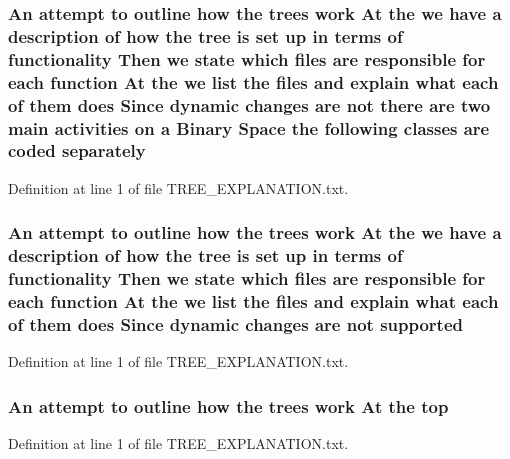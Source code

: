 \subsubsection[{separately}]{\setlength{\rightskip}{0pt plus 5cm}An attempt to outline how the trees work At the we have a description of how the tree is {\bf set} up in terms of functionality Then we state which files are responsible for each function At the we list the files and explain what each of them does Since dynamic changes are not there are two main activities on a Binary Space the following classes are coded separately}\label{TREE__EXPLANATION_8txt_ad716a54edcd729903b6c5fbcf0251ed4}


Definition at line 1 of file T\-R\-E\-E\-\_\-\-E\-X\-P\-L\-A\-N\-A\-T\-I\-O\-N.\-txt.

\subsubsection[{supported}]{\setlength{\rightskip}{0pt plus 5cm}An attempt to outline how the trees work At the we have a description of how the tree is {\bf set} up in terms of functionality Then we state which files are responsible for each function At the we list the files and explain what each of them does Since dynamic changes are not supported}\label{TREE__EXPLANATION_8txt_afb1a32b6e5d94f27b625d0c71f708b7f}


Definition at line 1 of file T\-R\-E\-E\-\_\-\-E\-X\-P\-L\-A\-N\-A\-T\-I\-O\-N.\-txt.

\subsubsection[{top}]{\setlength{\rightskip}{0pt plus 5cm}An attempt to outline how the trees work At the top}\label{TREE__EXPLANATION_8txt_aa0de655e906c293ac9089855106e3b64}


Definition at line 1 of file T\-R\-E\-E\-\_\-\-E\-X\-P\-L\-A\-N\-A\-T\-I\-O\-N.\-txt.

